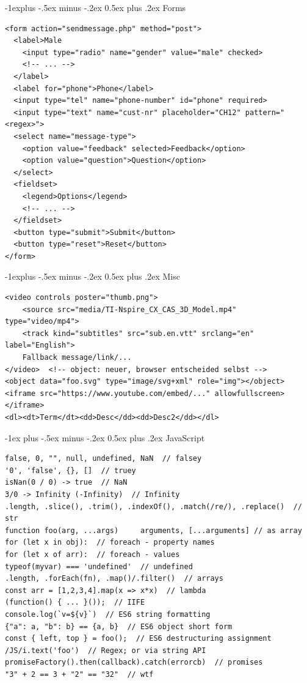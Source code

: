 \documentclass[10pt,landscape,a4paper]{article}
\makeatletter
\renewcommand{\section}{\@startsection{section}{1}{0mm}%
                                {-1ex plus -.5ex minus -.2ex}%
                                {0.5ex plus .2ex}%
                                {\normalfont\large\bfseries}}
\renewcommand{\subsection}{\@startsection{subsection}{2}{0mm}%
                                {-1explus -.5ex minus -.2ex}%
                                {0.5ex plus .2ex}%
                                {\normalfont\small\bfseries}}
\makeatother
\begin{document}
\begin{multicols*}{4}
\subsection{Forms}

\begin{verbatim}
<form action="sendmessage.php" method="post">
  <label>Male
    <input type="radio" name="gender" value="male" checked>
    <!-- ... -->
  </label>
  <label for="phone">Phone</label>
  <input type="tel" name="phone-number" id="phone" required> 
  <input type="text" name="cust-nr" placeholder="CH12" pattern="<regex>">
  <select name="message-type">
    <option value="feedback" selected>Feedback</option>
    <option value="question">Question</option>
  </select>
  <fieldset>
    <legend>Options</legend>
    <!-- ... -->
  </fieldset>
  <button type="submit">Submit</button>
  <button type="reset">Reset</button>
</form>
\end{verbatim}

\subsection{Misc}

\begin{verbatim}
<video controls poster="thumb.png">
    <source src="media/TI-Nspire_CX_CAS_3D_Model.mp4" type="video/mp4">
    <track kind="subtitles" src="sub.en.vtt" srclang="en" label="English">
    Fallback message/link/...
</video>  <!-- object: neuer, browser entscheided selbst -->
<object data="foo.svg" type="image/svg+xml" role="img"></object>
<iframe src="https://www.youtube.com/embed/..." allowfullscreen></iframe>
<dl><dt>Term</dt><dd>Desc</dd><dd>Desc2</dd></dl>
\end{verbatim}


\section{JavaScript}

\begin{verbatim}
false, 0, "", null, undefined, NaN  // falsey
'0', 'false', {}, []  // truey
isNan(0 / 0) -> true  // NaN
3/0 -> Infinity (-Infinity)  // Infinity
.length, .slice(), .trim(), .indexOf(), .match(/re/), .replace()  // str
function foo(arg, ...args)     arguments, [...arguments] // as array
for (let x in obj):  // foreach - property names
for (let x of arr):  // foreach - values
typeof(myvar) === 'undefined'  // undefined
.length, .forEach(fn), .map()/.filter()  // arrays
const arr = [1,2,3,4].map(x => x*x)  // lambda
(function() { ... }());  // IIFE
console.log(`v=${v}`)  // ES6 string formatting
{"a": a, "b": b} == {a, b}  // ES6 object short form
const { left, top } = foo();  // ES6 destructuring assignment
/JS/i.text('foo')  // Regex; or via string API
promiseFactory().then(callback).catch(errorcb)  // promises
"3" + 2 == 3 + "2" == "32"  // wtf
\end{verbatim}


\end{multicols*}
\end{document}
